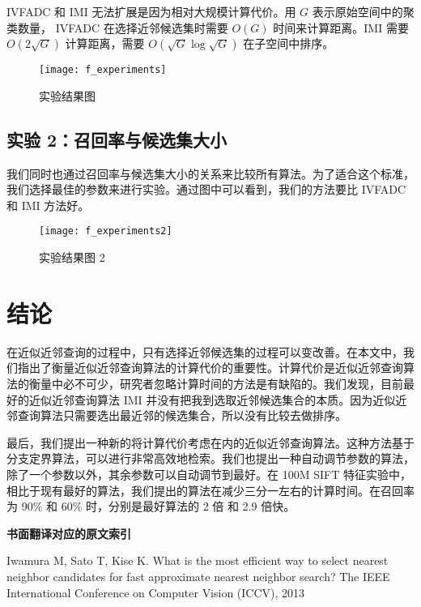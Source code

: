 IVFADC 和 IMI 无法扩展是因为相对大规模计算代价。用 $G$ 表示原始空间中的聚类数量， IVFADC 在选择近邻候选集时需要 $O(G)$ 时间来计算距离。IMI 需要 $O(2\sqrt{G})$ 计算距离，需要 $O(\sqrt{G}\log\sqrt{G})$ 在子空间中排序。
\begin{figure}[H]
  \centering
  \texttt{[image: f\_experiments]}
  \caption*{实验结果图}
  \label{fig:f_experiments}
\end{figure}
\subsection{实验 2：召回率与候选集大小}
我们同时也通过召回率与候选集大小的关系来比较所有算法。为了适合这个标准，我们选择最佳的参数来进行实验。通过图中可以看到，我们的方法要比 IVFADC 和 IMI 方法好。
\begin{figure}[H]
  \centering
  \texttt{[image: f\_experiments2]}
  \caption*{实验结果图 2}
  \label{fig:f_experiments2}
\end{figure}
\section{结论}
在近似近邻查询的过程中，只有选择近邻候选集的过程可以变改善。在本文中，我们指出了衡量近似近邻查询算法的计算代价的重要性。计算代价是近似近邻查询算法的衡量中必不可少，研究者忽略计算时间的方法是有缺陷的。我们发现，目前最好的近似近邻查询算法 IMI 并没有把我到选取近邻候选集合的本质。因为近似近邻查询算法只需要选出最近邻的候选集合，所以没有比较去做排序。

最后，我们提出一种新的将计算代价考虑在内的近似近邻查询算法。这种方法基于分支定界算法，可以进行非常高效地检索。我们也提出一种自动调节参数的算法，除了一个参数以外，其余参数可以自动调节到最好。在 100M SIFT 特征实验中，相比于现有最好的算法，我们提出的算法在减少三分一左右的计算时间。在召回率为 90\% 和 60\% 时，分别是最好算法的 2 倍 和 2.9 倍快。
\begin{center}
\textbf{书面翻译对应的原文索引}
\end{center}

\begin{enumerate}[{$[$}1{$]$}]
\item Iwamura M, Sato T, Kise K. What is the most efficient way to select nearest neighbor candidates for fast approximate nearest neighbor search? The IEEE International Conference on Computer Vision (ICCV), 2013
\end{enumerate}
